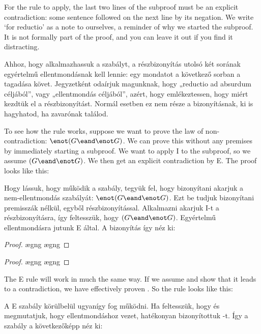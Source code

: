 For the rule to apply, the last two lines of the subproof must be an explicit contradiction: some sentence followed on the next line by its negation. We write `for reductio' as a note to ourselves, a reminder of why we started the subproof. It is not formally part of the proof, and you can leave it out if you find it distracting.

Ahhoz, hogy alkalmazhassuk a szabályt, a részbizonyítás utolsó két sorának egyértelmű ellentmondásnak kell lennie: egy mondatot a következő sorban a tagadása követ. Jegyzetként odaírjuk magunknak, hogy „reductio ad absurdum céljából”, vagy „ellentmondás céljából”, azért, hogy emlékeztessen, hogy miért kezdtük el a részbizonyítást. Normál esetben ez nem része a bizonyításnak, ki is hagyhatod, ha zavarónak találod.

To see how the rule works, suppose we want to prove the law of non-contradiction: $\enot(G \eand \enot G)$. We can prove this without any premises by immediately starting a subproof. We want to apply {\enot}I to the subproof, so we assume $(G \eand \enot G)$. We then get an explicit contradiction by {\eand}E. The proof looks like this:

Hogy lássuk, hogy működik a szabály, tegyük fel, hogy bizonyítani akarjuk a nem-ellentmondás szabályát: $\enot(G \eand \enot G)$. Ezt be tudjuk bizonyítani premisszák nélkül, egyből részbizonyítással. Alkalmazni akarjuk {\enot}I-t a részbizonyításra, így feltesszük, hogy $(G \eand \enot G)$. Egyértelmű ellentmondásra jutunk {\eand}E által. A bizonyítás így néz ki:

\begin{proof}
	\open
		\ae{gng}
		\ae{gng}
	\close
\end{proof}

\begin{proof}
	\open
		\ae{gng}
		\ae{gng}
	\close
\end{proof}

The {\enot}E rule will work in much the same way. If we assume \enot{} and show that it leads to a contradiction, we have effectively proven . So the rule looks like this:

A {\enot}E szabály körülbelül ugyanígy fog működni. Ha feltesszük, hogy \enot{} és megmutatjuk, hogy ellentmondáshoz vezet, hatékonyan bizonyítottuk -t. Így a szabály a következőképp néz ki:

